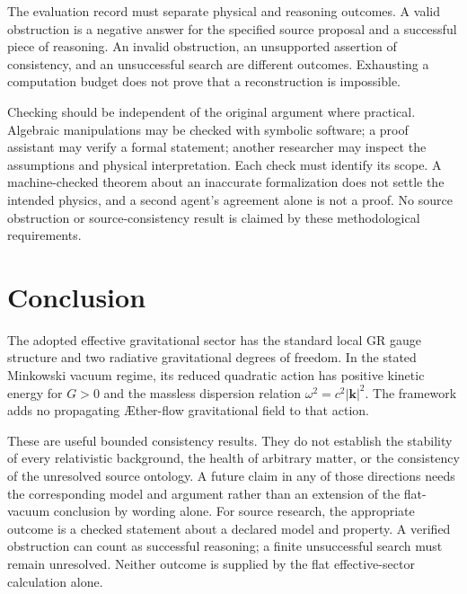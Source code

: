 \documentclass[11pt,oneside]{report}
\newcommand{\ArticleShort}{}
\newcommand{\Aflow}{\AE{}ther-flow}
\theoremstyle{remark}
\numberwithin{definition}{chapter}
\numberwithin{proposition}{chapter}
\numberwithin{remark}{chapter}
\begin{document}
The evaluation record must separate physical and reasoning outcomes. A valid obstruction is a negative answer for the specified source proposal and a successful piece of reasoning. An invalid obstruction, an unsupported assertion of consistency, and an unsuccessful search are different outcomes. Exhausting a computation budget does not prove that a reconstruction is impossible.

Checking should be independent of the original argument where practical. Algebraic manipulations may be checked with symbolic software; a proof assistant may verify a formal statement; another researcher may inspect the assumptions and physical interpretation. Each check must identify its scope. A machine-checked theorem about an inaccurate formalization does not settle the intended physics, and a second agent's agreement alone is not a proof. No source obstruction or source-consistency result is claimed by these methodological requirements.

\section{Conclusion}
The adopted effective gravitational sector has the standard local GR gauge structure and two radiative gravitational degrees of freedom. In the stated Minkowski vacuum regime, its reduced quadratic action has positive kinetic energy for $G>0$ and the massless dispersion relation $\omega^2=c^2|\mathbf k|^2$. The framework adds no propagating \Aflow{} gravitational field to that action.

These are useful bounded consistency results. They do not establish the stability of every relativistic background, the health of arbitrary matter, or the consistency of the unresolved source ontology. A future claim in any of those directions needs the corresponding model and argument rather than an extension of the flat-vacuum conclusion by wording alone.
For source research, the appropriate outcome is a checked statement about a declared model and property. A verified obstruction can count as successful reasoning; a finite unsuccessful search must remain unresolved. Neither outcome is supplied by the flat effective-sector calculation alone.

\clearpage
\renewcommand{\ArticleShort}{Relativistic recovery}
\end{document}

